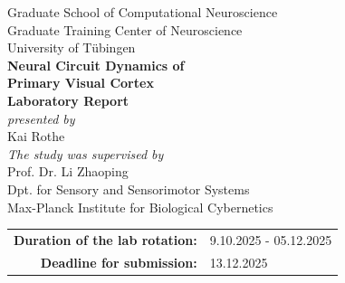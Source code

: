 


\begin{titlepage} %
\centering
{\Large Graduate School of Computational Neuroscience}\\[0.3cm]
{\Large Graduate Training Center of Neuroscience}\\[0.3cm]
{\Large University of Tübingen}\\[3cm]

{\huge \textbf{Neural Circuit Dynamics of\\Primary Visual Cortex}} %
\\[3cm]

{\LARGE \textbf{Laboratory Report}}\\[0.5cm]
\textit{presented by}\\[0.5cm]
{\Large Kai Rothe}\\[2cm]

\textit{The study was supervised by}\\[0.5cm]
{\Large Prof. Dr. Li Zhaoping}\\[0.5cm]
{\large Dpt. for Sensory and Sensorimotor Systems}\\[0.3cm]
{\large Max-Planck Institute for Biological Cybernetics}\\

\vfill

\begin{tabular}{rl}
    \textbf{Duration of the lab rotation:} & 9.10.2025 - 05.12.2025 \\[0.5cm]
    \textbf{Deadline for submission:} & 13.12.2025 \\
\end{tabular}

\end{titlepage}